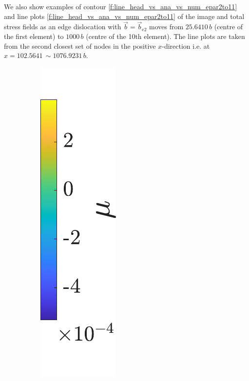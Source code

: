 \documentclass[11pt]{iopart}
\begin{document}
We also show examples of contour \cref{f:line_head_vs_ana_vs_num_epar2to11} and line plots \cref{f:line_head_vs_ana_vs_num_epar2to11} of the image and total stress fields as an edge dislocation with $\vec{b} = \vec{b}_{\textrm{e2}}$ moves from $25.6410\, b$ (centre of the first element) to $1000\, b$ (centre of the 10th element). The line plots are taken from the second closest set of nodes in the positive $x$-direction i.e. at $x = 102.5641\, \sim 1076.9231\, b$.
\begin{figure}
    \centering
    ~
    ~
    ~
    \subfloat
    {
        {\includegraphics[height=0.227\linewidth]{images/sxxNAEpar_leg.pdf}}
    }


\end{figure}
\end{document}
